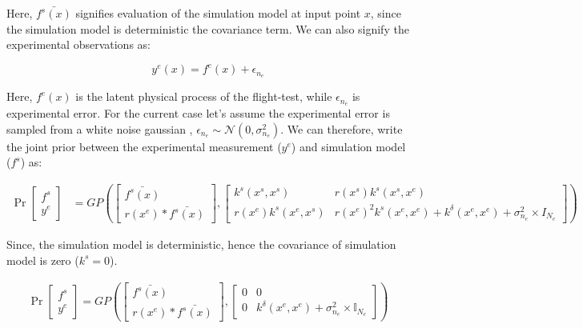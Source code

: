 Here, $\bar{f^{s}(x)}$ signifies evaluation of the simulation model at input point $x$, since the simulation model is deterministic the covariance term. We can also signify the experimental observations as:

\begin{equation}
    y^{e}(x) = f^{e}(x) + \epsilon_{n_{e}} 
\end{equation}

Here, $f^{e}(x)$ is the latent physical process of the flight-test, while $\epsilon_{n_{e}}$ is experimental error. For the current case let's assume the experimental error is sampled from a white noise gaussian , $\epsilon_{n_{e}} \sim \mathcal{N}(0, \sigma_{n_{e}}^2)$. We can therefore, write the joint prior between the experimental measurement ($y^{e}$) and simulation model ($f^{s}$) as:

\begin{equation}
\begin{aligned}
     \Pr \begin{bmatrix}
f^{s}\\ 
y^{e}
\end{bmatrix}  & = GP\left ( \begin{bmatrix}
\bar{f^{s}(x)}\\ 
r(x^{e})*\bar{f^{s}(x)}
\end{bmatrix}, \begin{bmatrix} k^{s}(x^{s}, x^{s}) & r(x^{s})k^{s}(x^{s}, x^{e})   \\
           r(x^{e})k^{s}(x^{e}, x^{s}) & r(x^{e})^2k^{s}(x^{e}, x^{e}) + k^{\delta}(x^{e}, x^{e}) + \sigma_{n_{e}}^2 \times I_{N_{e}}\end{bmatrix}   \right )
           \end{aligned}
\end{equation}

Since, the simulation model is deterministic, hence the covariance of simulation model is zero ($k^s = 0$).

\begin{align}
\Pr \begin{bmatrix}
f^{s}\\ 
y^{e}
\end{bmatrix}    = GP \left ( \begin{bmatrix}
\bar{f^{s}(x)}\\ 
r(x^{e})*\bar{f^{s}(x)}
\end{bmatrix}, \begin{bmatrix} 0 & 0   \\
           0 & k^{\delta}(x^{e}, x^{e}) + \sigma_{n_{e}}^2 \times \mathbb{I}_{N_{e}}\end{bmatrix} \right ) 
\end{align}

